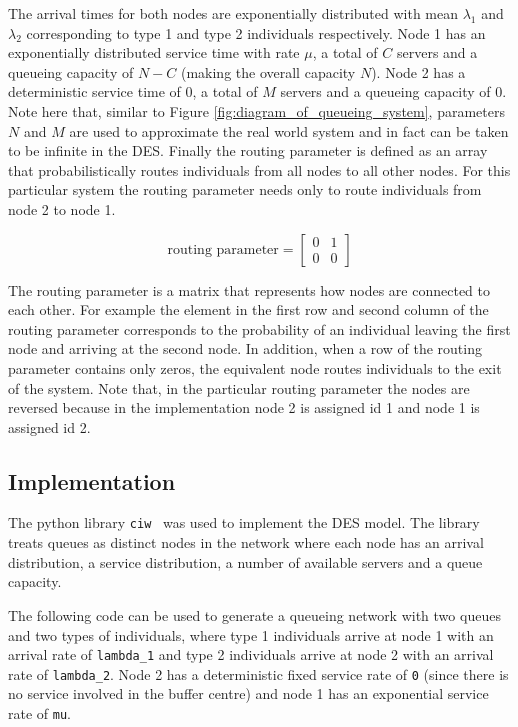 The arrival times for both nodes are exponentially distributed with
mean \(\lambda_1\) and \(\lambda_2\) corresponding to type 1 and type 2
individuals respectively.
Node 1 has an exponentially distributed service time with rate \(\mu\),
a total of \(C\) servers and a queueing capacity of \(N - C\) (making the
overall capacity \(N\)). 
Node 2 has a deterministic service time of \(0\), a total of \(M\)
servers and a queueing capacity of \(0\).
Note here that, similar to Figure \ref{fig:diagram_of_queueing_system},
parameters \(N\) and \(M\) are used to approximate the real world system 
and in fact can be taken to be infinite in the DES.
Finally the routing parameter is defined as an array that probabilistically
routes individuals from all nodes to all other nodes.
For this particular system the routing parameter needs only to route individuals
from node 2 to node 1.

\begin{equation}
    \text{routing parameter} = \left[
    \begin{array}{cc}
        0 & 1 \\
        0 & 0
    \end{array}
    \right]
\end{equation}

The routing parameter is a matrix that represents how nodes are connected to
each other.
For example the element in the first row and second column of the routing
parameter corresponds to the probability of an individual leaving the first
node and arriving at the second node.
In addition, when a row of the routing parameter contains only zeros, the
equivalent node routes individuals to the exit of the system.
Note that, in the particular routing parameter the nodes are reversed because
in the implementation node 2 is assigned id 1 and node 1 is assigned id 2.

\subsection{Implementation}
The python library \texttt{ciw}~\cite{ciwpython, ciwarticle}
was used to implement the DES model.
The library treats queues as distinct nodes in the network where each node has
an arrival distribution, a service distribution, a number of available servers
and a queue capacity.

The following code can be used to generate a queueing network with two
queues and two types of individuals, where type 1 individuals arrive at node
1 with an arrival rate of \texttt{lambda\_1} and type 2
individuals arrive at node 2 with an arrival rate of
\texttt{lambda\_2}.
Node 2 has a deterministic fixed service rate of
\texttt{0} (since there is no service involved in the buffer
centre) and node 1 has an exponential service rate of
\texttt{mu}.

